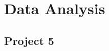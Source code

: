 \chapter{Data Analysis\label{ch:data_analysis_models}}
    
    \section{Project 5\label{prj:project5}}
    \clearpage{\pagestyle{empty}\cleardoublepage}  %


\clearpage{\pagestyle{plain}\cleardoublepage} %
